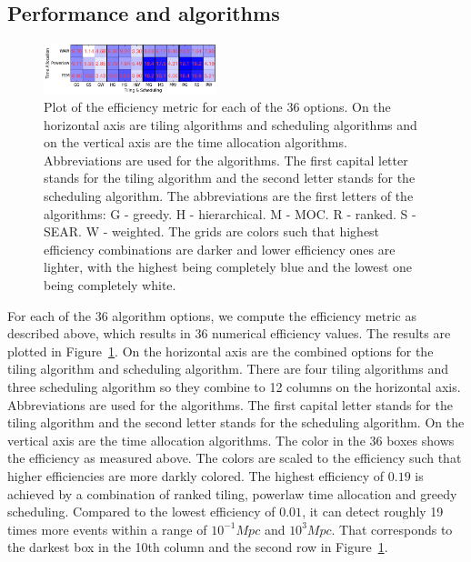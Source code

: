 \documentclass[twocolumn]{aastex62}
\begin{document}
\subsection{Performance and algorithms}
\begin{figure}[t]
\includegraphics[width=0.45\textwidth]{plots/efficiency.png}
\caption{Plot of the efficiency metric for each of the 36 options. On the horizontal axis are tiling algorithms and scheduling algorithms and on the vertical axis are the time allocation algorithms. Abbreviations are used for the algorithms. The first capital letter stands for the tiling algorithm and the second letter stands for the scheduling algorithm. The abbreviations are the first letters of the algorithms: G - greedy. H - hierarchical. M - MOC. R - ranked. S - SEAR. W - weighted. The grids are colors such that highest efficiency combinations are darker and lower efficiency ones are lighter, with the highest being completely blue and the lowest one being completely white.}
\label{fig:eff_metric}
\centering
\end{figure}
For each of the 36 algorithm options, we compute the efficiency metric as described above, which results in 36 numerical efficiency values. The results are plotted in Figure~\ref{fig:eff_metric}. On the horizontal axis are the combined options for the tiling algorithm and scheduling algorithm. There are four tiling algorithms and three scheduling algorithm so they combine to 12 columns on the horizontal axis. Abbreviations are used for the algorithms. The first capital letter stands for the tiling algorithm and the second letter stands for the scheduling algorithm. On the vertical axis are the time allocation algorithms. The color in the 36 boxes shows the efficiency as measured above. The colors are scaled to the efficiency such that higher efficiencies are more darkly colored.
The highest efficiency of $0.19$ is achieved by a combination of ranked tiling, powerlaw time allocation and greedy scheduling. Compared to the lowest efficiency of $0.01$, it can detect roughly 19 times more events within a range of $10^{-1} Mpc$ and $10^3 Mpc$. That corresponds to the darkest box in the 10th column and the second row in Figure~\ref{fig:eff_metric}. 
\end{document}
